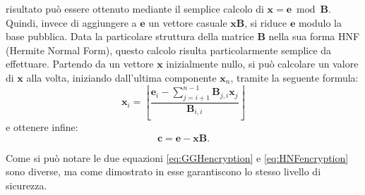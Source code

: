 risultato può essere ottenuto mediante il semplice calcolo di 
$\mathbf{x} = \mathbf{e} \bmod \mathbf{B}$. Quindi, invece di aggiungere a $\mathbf{e}$ un
vettore casuale $\mathbf{x}\mathbf{B}$, si riduce $\mathbf{e}$ modulo la base pubblica.
Data la particolare struttura della matrice 
$\mathbf{B}$ nella sua forma HNF (Hermite Normal Form), questo calcolo risulta particolarmente 
semplice da effettuare. Partendo da un vettore $\mathbf{x}$
inizialmente nullo, si può calcolare un valore di $\mathbf{x}$ alla volta, iniziando dall'ultima 
componente $\mathbf{x}_n$, tramite la seguente formula:
\[
    \mathbf{x}_i = \left\lfloor \frac{\mathbf{e}_i - 
    \sum_{j=i+1}^{n-1} \mathbf{B}_{j,i} \mathbf{x}_j}{\mathbf{B}_{i,i}} \right\rfloor
\]
e ottenere infine:
\begin{equation}
    \label{eq:HNFencryption}
    \mathbf{c} = \mathbf{e} - \mathbf{x}\mathbf{B}.
\end{equation}

Come si può notare le due equazioni \ref{eq:GGHencryption} e \ref{eq:HNFencryption} sono
diverse, ma come dimostrato in \cite[Sezione 4.3]{HNF01} esse garantiscono lo stesso
livello di sicurezza. 

%
%
